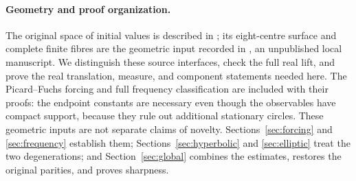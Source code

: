 \paragraph{Geometry and proof organization.}
The original space of initial values is described in
\cite{JoshiRoffelsen2026}; its eight-centre surface and complete finite
fibres are the geometric input recorded in \cite{QPI30Local2026}, an
unpublished local manuscript. We distinguish these source interfaces,
check the full real lift, and prove the real translation, measure,
and component statements needed here.
The Picard--Fuchs forcing and full frequency classification are
included with their proofs: the endpoint constants are necessary
even though the observables have compact support, because they rule
out additional stationary circles. These geometric inputs are not
separate claims of novelty. Sections~\ref{sec:forcing} and
\ref{sec:frequency} establish them; Sections~\ref{sec:hyperbolic}
and \ref{sec:elliptic} treat the two degenerations; and
Section~\ref{sec:global} combines the estimates, restores the original
parities, and proves sharpness.
